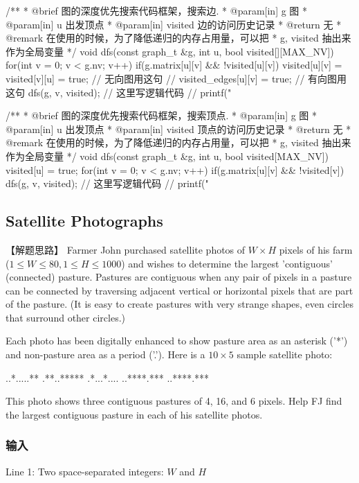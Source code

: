 \begin{Codex}[label=graph_dfs.cpp]
/**
 * @brief 图的深度优先搜索代码框架，搜索边.
 * @param[in] g 图
 * @param[in] u 出发顶点
 * @param[in] visited 边的访问历史记录
 * @return 无
 * @remark 在使用的时候，为了降低递归的内存占用量，可以把
 * g, visited 抽出来作为全局变量
 */
void dfs(const graph_t &g, int u, bool visited[][MAX_NV]) {
    for(int v = 0;  v < g.nv; v++) if(g.matrix[u][v] && !visited[u][v]) {
        visited[u][v] = visited[v][u] = true; // 无向图用这句
        // visited_edges[u][v] = true; // 有向图用这句
        dfs(g, v, visited);
        // 这里写逻辑代码
        // printf("%
    }
}

/**
 * @brief 图的深度优先搜索代码框架，搜索顶点.
 * @param[in] g 图
 * @param[in] u 出发顶点
 * @param[in] visited 顶点的访问历史记录
 * @return 无
 * @remark 在使用的时候，为了降低递归的内存占用量，可以把
 * g, visited 抽出来作为全局变量
 */
void dfs(const graph_t &g, int u, bool visited[MAX_NV]) {
    visited[u] = true;
    for(int v = 0;  v < g.nv; v++) if(g.matrix[u][v] && !visited[v]) {
        dfs(g, v, visited);
        // 这里写逻辑代码
        // printf("%
    }
}
\end{Codex}


\subsection{Satellite Photographs}

【解题思路】
Farmer John purchased satellite photos of $W \times H$ pixels of his farm ($1 \leq W \leq 80, 1 \leq H \leq 1000$) and wishes to determine the largest 'contiguous' (connected) pasture. Pastures are contiguous when any pair of pixels in a pasture can be connected by traversing adjacent vertical or horizontal pixels that are part of the pasture. (It is easy to create pastures with very strange shapes, even circles that surround other circles.) 

Each photo has been digitally enhanced to show pasture area as an asterisk ('*') and non-pasture area as a period ('.'). Here is a $10 \times 5$ sample satellite photo: 
\begin{Code}
..*.....** 
.**..***** 
.*...*.... 
..****.*** 
..****.*** 
\end{Code}

This photo shows three contiguous pastures of 4, 16, and 6 pixels. Help FJ find the largest contiguous pasture in each of his satellite photos.


\subsubsection{输入}
Line 1: Two space-separated integers: $W$ and $H$ 

